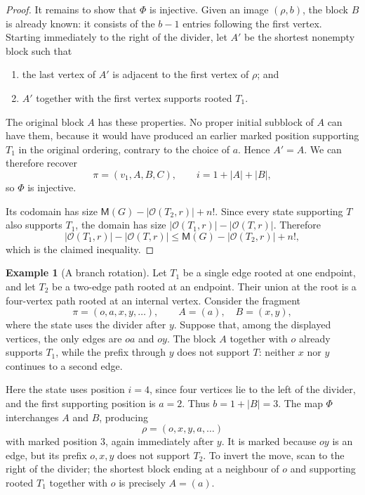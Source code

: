 \documentclass[11pt]{article}
\numberwithin{equation}{section}
\theoremstyle{definition}
\newtheorem{example}[theorem]{Example}
\newcommand{\cO}{\mathcal O}
\newcommand{\Mcnt}{\mathsf M}
\begin{document}
\begin{proof}
It remains to show that $\Phi$ is injective.  Given an image $(\rho,b)$,
the block $B$ is already known: it consists of the $b-1$ entries following
the first vertex.  Starting immediately to the right of the divider, let $A'$
be the shortest nonempty block such that
\begin{enumerate}[label=(\roman*),leftmargin=2.3em]
\item the last vertex of $A'$ is adjacent to the first vertex of $\rho$;
      and
\item $A'$ together with the first vertex supports rooted $T_1$.
\end{enumerate}
The original block $A$ has these properties.  No proper initial subblock of
$A$ can have them, because it would have produced an earlier marked position
supporting $T_1$ in the original ordering, contrary to the choice of $a$.
Hence $A'=A$.  We can therefore recover
\[
        \pi=(v_1,A,B,C),\qquad i=1+|A|+|B|,
\]
so $\Phi$ is injective.

Its codomain has size $\Mcnt(G)-|\cO(T_2,r)|+n!$.  Since every state
supporting $T$ also supports $T_1$, the domain has size
$|\cO(T_1,r)|-|\cO(T,r)|$.  Therefore
\[
 |\cO(T_1,r)|-|\cO(T,r)|
 \leq \Mcnt(G)-|\cO(T_2,r)|+n!,
\]
which is the claimed inequality.
\end{proof}

\begin{example}[A branch rotation]\label{ex:rotation}
Let $T_1$ be a single edge rooted at one endpoint, and let $T_2$ be a
two-edge path rooted at an endpoint.  Their union at the root is a
four-vertex path rooted at an internal vertex.  Consider the fragment
\[
        \pi=(o,a,x,y,\ldots),
        \qquad A=(a),\quad B=(x,y),
\]
where the state uses the divider after $y$.  Suppose
that, among the displayed vertices, the only edges are $oa$ and $oy$.  The block $A$ together with $o$ already supports $T_1$, while the
prefix through $y$ does not support $T$: neither $x$ nor $y$ continues to a
second edge.

Here the state uses position $i=4$, since four vertices lie to the left of
the divider, and the first supporting position is $a=2$.  Thus
$b=1+|B|=3$.  The map $\Phi$ interchanges $A$ and $B$, producing
\[
        \rho=(o,x,y,a,\ldots)
\]
with marked position $3$, again immediately after $y$.  It is marked
because $oy$ is an edge, but its prefix $o,x,y$ does not support $T_2$.
To invert the move, scan to the right of the divider; the shortest block ending
at a neighbour of $o$ and supporting rooted $T_1$ together with $o$ is
precisely $A=(a)$.
\end{example}
\end{document}
